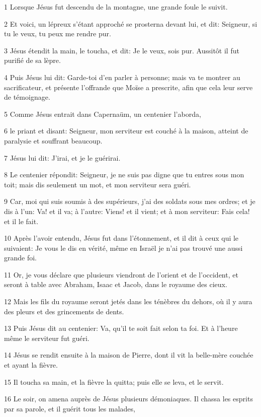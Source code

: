 \par 1 Lorsque Jésus fut descendu de la montagne, une grande foule le suivit.
\par 2 Et voici, un lépreux s'étant approché se prosterna devant lui, et dit: Seigneur, si tu le veux, tu peux me rendre pur.
\par 3 Jésus étendit la main, le toucha, et dit: Je le veux, sois pur. Aussitôt il fut purifié de sa lèpre.
\par 4 Puis Jésus lui dit: Garde-toi d'en parler à personne; mais va te montrer au sacrificateur, et présente l'offrande que Moïse a prescrite, afin que cela leur serve de témoignage.
\par 5 Comme Jésus entrait dans Capernaüm, un centenier l'aborda,
\par 6 le priant et disant: Seigneur, mon serviteur est couché à la maison, atteint de paralysie et souffrant beaucoup.
\par 7 Jésus lui dit: J'irai, et je le guérirai.
\par 8 Le centenier répondit: Seigneur, je ne suis pas digne que tu entres sous mon toit; mais dis seulement un mot, et mon serviteur sera guéri.
\par 9 Car, moi qui suis soumis à des supérieurs, j'ai des soldats sous mes ordres; et je dis à l'un: Va! et il va; à l'autre: Viens! et il vient; et à mon serviteur: Fais cela! et il le fait.
\par 10 Après l'avoir entendu, Jésus fut dans l'étonnement, et il dit à ceux qui le suivaient: Je vous le dis en vérité, même en Israël je n'ai pas trouvé une aussi grande foi.
\par 11 Or, je vous déclare que plusieurs viendront de l'orient et de l'occident, et seront à table avec Abraham, Isaac et Jacob, dans le royaume des cieux.
\par 12 Mais les fils du royaume seront jetés dans les ténèbres du dehors, où il y aura des pleurs et des grincements de dents.
\par 13 Puis Jésus dit au centenier: Va, qu'il te soit fait selon ta foi. Et à l'heure même le serviteur fut guéri.
\par 14 Jésus se rendit ensuite à la maison de Pierre, dont il vit la belle-mère couchée et ayant la fièvre.
\par 15 Il toucha sa main, et la fièvre la quitta; puis elle se leva, et le servit.
\par 16 Le soir, on amena auprès de Jésus plusieurs démoniaques. Il chassa les esprits par sa parole, et il guérit tous les malades,
